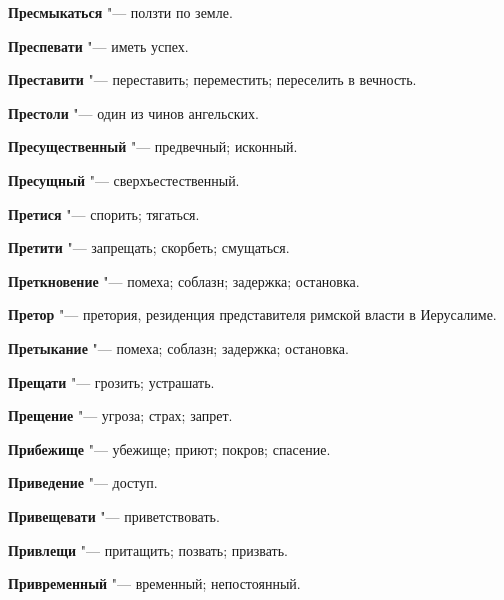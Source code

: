 \begin{mymulticols}{2}
\noindent\textbf{Пресмыкаться} "--- ползти по земле. 




\noindent\textbf{Преспевати} "--- иметь успех. 




\noindent\textbf{Преставити} "--- переставить; переместить; переселить в вечность. 




\noindent\textbf{Престоли} "--- один из чинов ангельских. 




\noindent\textbf{Пресущественный} "--- предвечный; исконный. 




\noindent\textbf{Пресущный} "--- сверхъестественный. 




\noindent\textbf{Претися} "--- спорить; тягаться. 




\noindent\textbf{Претити} "--- запрещать; скорбеть; смущаться. 




\noindent\textbf{Преткновение} "--- помеха; соблазн; задержка; остановка. 




\noindent\textbf{Претор} "--- претория, резиденция представителя римской власти в Иерусалиме. 




\noindent\textbf{Претыкание} "--- помеха; соблазн; задержка; остановка. 




\noindent\textbf{Прещати} "--- грозить; устрашать. 




\noindent\textbf{Прещение} "--- угроза; страх; запрет. 




\noindent\textbf{Прибежище} "--- убежище; приют; покров; спасение. 




\noindent\textbf{Приведение} "--- доступ. 




\noindent\textbf{Привещевати} "--- приветствовать. 




\noindent\textbf{Привлещи} "--- притащить; позвать; призвать. 




\noindent\textbf{Привременный} "--- временный; непостоянный. 





\end{mymulticols}
